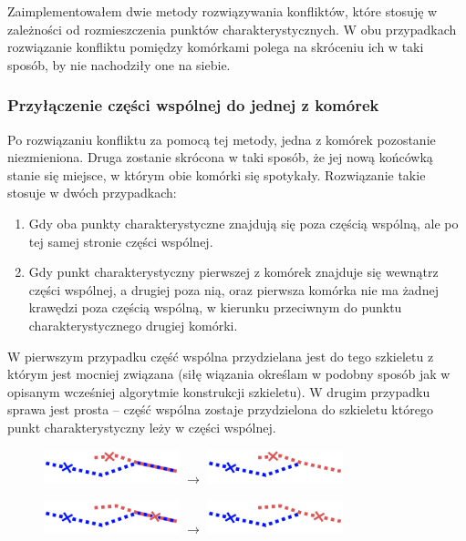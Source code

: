 \documentclass[declaration,shortabstract,mgr]{iithesis}
\begin{document}
Zaimplementowałem dwie metody rozwiązywania konfliktów, które stosuję w zależności od rozmieszczenia punktów charakterystycznych.
W obu przypadkach rozwiązanie konfliktu pomiędzy komórkami polega na skróceniu ich w taki sposób, by nie nachodziły one na siebie.

\subsubsection{Przyłączenie części wspólnej do jednej z komórek}

Po rozwiązaniu konfliktu za pomocą tej metody, jedna z komórek pozostanie niezmieniona.
Druga zostanie skrócona w taki sposób, że jej nową końcówką stanie się miejsce, w którym obie komórki się spotykały.
Rozwiązanie takie stosuje w dwóch przypadkach:
\begin{enumerate}
  \item Gdy oba punkty charakterystyczne znajdują się poza częścią wspólną, ale po tej samej stronie części wspólnej.
  \item Gdy punkt charakterystyczny pierwszej z komórek znajduje się wewnątrz części wspólnej, a drugiej poza nią, oraz pierwsza komórka nie ma żadnej krawędzi poza częścią wspólną, w kierunku przeciwnym do punktu charakterystycznego drugiej komórki.
\end{enumerate}

W pierwszym przypadku część wspólna przydzielana jest do tego szkieletu z którym jest mocniej związana (siłę wiązania określam w podobny sposób jak w opisanym wcześniej algorytmie konstrukcji szkieletu).
W drugim przypadku sprawa jest prosta -- część wspólna zostaje przydzielona do szkieletu którego punkt charakterystyczny leży w części wspólnej.

\begin{figure}[H]
  \centering
  \includegraphics[valign=m,width=0.35\textwidth]{images/overlap-out-out-assign.png}
  $\rightarrow$
  \includegraphics[valign=m,width=0.35\textwidth]{images/overlap-out-out-assign-solved.png}
\end{figure}

\begin{figure}[H]
  \centering
  \includegraphics[valign=m,width=0.35\textwidth]{images/overlap-out-in-assign.png}
  $\rightarrow$
  \includegraphics[valign=m,width=0.35\textwidth]{images/overlap-out-in-assign-solved.png}
\end{figure}
\end{document}
